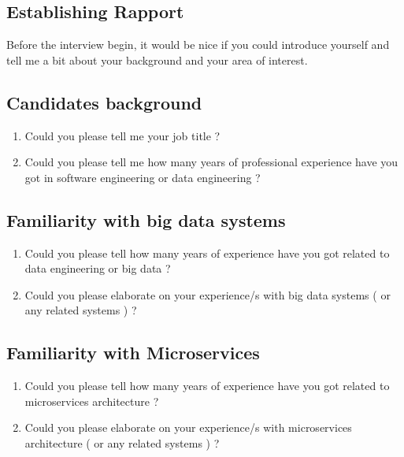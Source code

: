 \documentclass{bmcart}
\begin{document}
\begin{backmatter}
\subsection*{\textbf{Establishing Rapport}}

Before the interview begin, it would be nice if you could introduce yourself and tell me a bit about your background and your area of interest. 

\subsection*{\textbf{Candidates background}}

\begin{enumerate}
    \item Could you please tell me your job title ? 
    \item Could you please tell me how many years of professional experience have you got in software engineering or data engineering ? 
\end{enumerate}

\subsection*{\textbf{Familiarity with big data systems}}

\begin{enumerate}
    \item Could you please tell how many years of experience have you got related to data engineering or big data ?
    \item Could you please elaborate on your experience/s with big data systems ( or any related systems ) ? 
\end{enumerate}


\subsection*{\textbf{Familiarity with Microservices}}

\begin{enumerate}
    \item Could you please tell how many years of experience have you got related to microservices architecture ?
    \item Could you please elaborate on your experience/s with microservices architecture ( or any related systems ) ?
\end{enumerate}



\end{backmatter}
\end{document}
